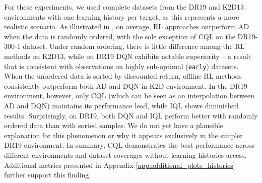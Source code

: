 \documentclass{article}
\begin{document}
For these experiments, we used complete datasets from the DR19 and K2D13 environments with one learning history per target, as this represents a more realistic scenario. As illustrated in , on average, RL approaches outperform AD when the data is randomly ordered, with the sole exception of CQL on the DR19-300-1 dataset. Under random ordering, there is little difference among the RL methods on K2D13, while on DR19 DQN exhibits notable superiority -- a result that is consistent with observations on highly sub-optimal (\texttt{early}) datasets. When the unordered data is sorted by discounted return, offline RL methods consistently outperform both AD and DQN in K2D environment. In the DR19 environment, however, only CQL (which can be seen as an interpolation between AD and DQN) maintains its performance lead, while IQL shows diminished results. Surprisingly, on DR19, both DQN and IQL perform better with randomly ordered data than with sorted samples. We do not yet have a plausible explanation for this phenomenon or why it appears exclusively in the simpler DR19 environment.
In summary, CQL demonstrates the best performance across different environments and dataset coverages without learning histories access. Additional metrics presented in Appendix \ref{app:additional_plots_histories} further support this finding.
\end{document}
